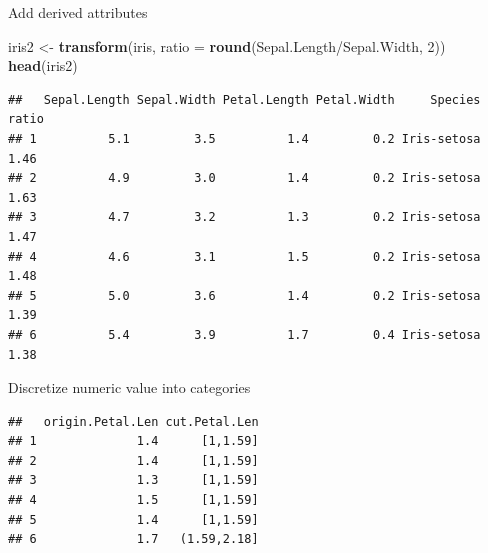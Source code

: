 \documentclass[ignorenonframetext,]{beamer}
\newenvironment{Shaded}{\begin{snugshade}}{\end{snugshade}}
\newcommand{\KeywordTok}[1]{\textcolor[rgb]{0.13,0.29,0.53}{\textbf{{#1}}}}
\newcommand{\DataTypeTok}[1]{\textcolor[rgb]{0.13,0.29,0.53}{{#1}}}
\newcommand{\DecValTok}[1]{\textcolor[rgb]{0.00,0.00,0.81}{{#1}}}
\newcommand{\StringTok}[1]{\textcolor[rgb]{0.31,0.60,0.02}{{#1}}}
\newcommand{\CommentTok}[1]{\textcolor[rgb]{0.56,0.35,0.01}{\textit{{#1}}}}
\newcommand{\NormalTok}[1]{{#1}}
\begin{document}
\begin{frame}[fragile]{Add derived attributes}

\begin{Shaded}
\begin{Highlighting}[]
\NormalTok{iris2 <-}\StringTok{ }\KeywordTok{transform}\NormalTok{(iris, }\DataTypeTok{ratio =} \KeywordTok{round}\NormalTok{(Sepal.Length/Sepal.Width, }
    \DecValTok{2}\NormalTok{))}
\KeywordTok{head}\NormalTok{(iris2)}
\end{Highlighting}
\end{Shaded}

\begin{verbatim}
##   Sepal.Length Sepal.Width Petal.Length Petal.Width     Species ratio
## 1          5.1         3.5          1.4         0.2 Iris-setosa  1.46
## 2          4.9         3.0          1.4         0.2 Iris-setosa  1.63
## 3          4.7         3.2          1.3         0.2 Iris-setosa  1.47
## 4          4.6         3.1          1.5         0.2 Iris-setosa  1.48
## 5          5.0         3.6          1.4         0.2 Iris-setosa  1.39
## 6          5.4         3.9          1.7         0.4 Iris-setosa  1.38
\end{verbatim}

\end{frame}

\begin{frame}[fragile]{Discretize numeric value into categories}

\begin{Shaded}
\end{Shaded}

\begin{verbatim}
##   origin.Petal.Len cut.Petal.Len
## 1              1.4      [1,1.59]
## 2              1.4      [1,1.59]
## 3              1.3      [1,1.59]
## 4              1.5      [1,1.59]
## 5              1.4      [1,1.59]
## 6              1.7   (1.59,2.18]
\end{verbatim}

\end{frame}
\end{document}

